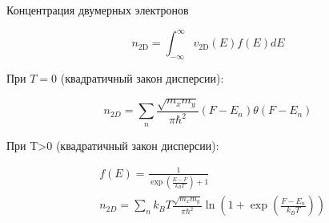 \documentclass[10pt]{article}
\begin{document}
Концентрация двумерных электронов

$$
n_{2 \mathrm{D}}=\int_{-\infty}^{\infty} v_{2 \mathrm{D}}(E) f(E) d E
$$

При $T=0$ (квадратичный закон дисперсии):

$$
n_{2 D}=\sum_{n} \frac{\sqrt{m_{x} m_{y}}}{\pi \hbar^{2}}\left(F-E_{n}\right) \theta\left(F-E_{n}\right)
$$

При T>0 (квадратичный закон дисперсии):

$$
\begin{aligned}
& f(E)=\frac{1}{\exp \left(\frac{E-F}{k_{B} T}\right)+1} \\
& n_{2 D}=\sum_{n} k_{B} T \frac{\sqrt{m_{x} m_{y}}}{\pi \hbar^{2}} \ln \left(1+\exp \left(\frac{F-E_{n}}{k_{B} T}\right)\right)
\end{aligned}
$$
\end{document}
